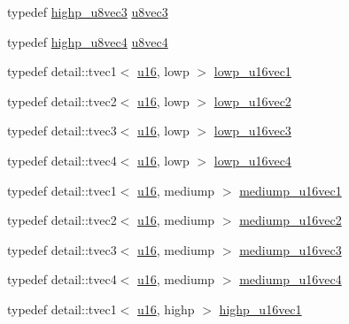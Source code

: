 \begin{CompactItemize}
\item 
typedef \hyperlink{group__gtc__type__precision_g52bdf53a4f05023c13a9b817526d249f}{highp\_\-u8vec3} \hyperlink{group__gtc__type__precision_g3b4624ecd0485fe5143f956864e7934e}{u8vec3}
\item 
typedef \hyperlink{group__gtc__type__precision_g3a46f19674a65471988b41ffdaa834c5}{highp\_\-u8vec4} \hyperlink{group__gtc__type__precision_gaf6b3d127698d893de8652deedfd3d9b}{u8vec4}
\item 
typedef detail::tvec1$<$ \hyperlink{group__gtc__type__precision_ge7a1571503f83d2264ddfa705a6b082a}{u16}, lowp $>$ \hyperlink{group__gtc__type__precision_g25464b09e8e3c63f6896605e0c997eb1}{lowp\_\-u16vec1}
\item 
typedef detail::tvec2$<$ \hyperlink{group__gtc__type__precision_ge7a1571503f83d2264ddfa705a6b082a}{u16}, lowp $>$ \hyperlink{group__gtc__type__precision_gff5ca5a8bc621bb8f4b28f046c0de508}{lowp\_\-u16vec2}
\item 
typedef detail::tvec3$<$ \hyperlink{group__gtc__type__precision_ge7a1571503f83d2264ddfa705a6b082a}{u16}, lowp $>$ \hyperlink{group__gtc__type__precision_g74d5491c9ee66d068309d200601e907b}{lowp\_\-u16vec3}
\item 
typedef detail::tvec4$<$ \hyperlink{group__gtc__type__precision_ge7a1571503f83d2264ddfa705a6b082a}{u16}, lowp $>$ \hyperlink{group__gtc__type__precision_gb0210f390e7d75fa8eb42128a05ff23a}{lowp\_\-u16vec4}
\item 
typedef detail::tvec1$<$ \hyperlink{group__gtc__type__precision_ge7a1571503f83d2264ddfa705a6b082a}{u16}, mediump $>$ \hyperlink{group__gtc__type__precision_gcb35d25d662b2a6396d094197ca834f0}{mediump\_\-u16vec1}
\item 
typedef detail::tvec2$<$ \hyperlink{group__gtc__type__precision_ge7a1571503f83d2264ddfa705a6b082a}{u16}, mediump $>$ \hyperlink{group__gtc__type__precision_g93fe5ddc21391f0334eb3a60b76c390b}{mediump\_\-u16vec2}
\item 
typedef detail::tvec3$<$ \hyperlink{group__gtc__type__precision_ge7a1571503f83d2264ddfa705a6b082a}{u16}, mediump $>$ \hyperlink{group__gtc__type__precision_g82dbfd263ced8d03577008a3ef096598}{mediump\_\-u16vec3}
\item 
typedef detail::tvec4$<$ \hyperlink{group__gtc__type__precision_ge7a1571503f83d2264ddfa705a6b082a}{u16}, mediump $>$ \hyperlink{group__gtc__type__precision_gad8b540f4231f69823c39fe9dfcb945a}{mediump\_\-u16vec4}
\item 
typedef detail::tvec1$<$ \hyperlink{group__gtc__type__precision_ge7a1571503f83d2264ddfa705a6b082a}{u16}, highp $>$ \hyperlink{group__gtc__type__precision_gc4a83dec879b77ab0055c8da232da066}{highp\_\-u16vec1}

\end{CompactItemize}
